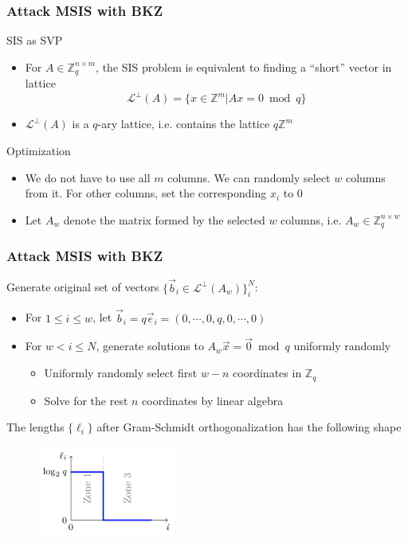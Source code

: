 \documentclass{beamer}
\newcommand{\bbZ}{\mathbb{Z}}
\newcommand{\vb}{\vec{b}}
\newcommand{\cLp}{\mathcal{L}^{\perp}}
\begin{document}
\frame
{
  \frametitle{Attack MSIS with BKZ}
  SIS as SVP
  \begin{itemize}
  	\item For $A\in\bbZ_q^{n\times m}$, the SIS problem is equivalent to finding a ``short'' vector in lattice
  		\[\cLp(A)=\{x\in\bbZ^m | Ax=0\bmod q\}\]
  	\item $\cLp(A)$ is a $q$-ary lattice, i.e. contains the lattice $q\mathbb{Z}^m$
  \end{itemize}

  Optimization
  \begin{itemize}
  	\item We do not have to use all $m$ columns. We can randomly select $w$ columns from it. For other columns, set the corresponding $x_i$ to $0$
  	\item Let $A_w$ denote the matrix formed by the selected $w$ columns, i.e. $A_w\in\bbZ_q^{n\times w}$
  \end{itemize}
}

\frame
{
  \frametitle{Attack MSIS with BKZ}
  Generate original set of vectors $\{\vb_i\in\cLp(A_w)\}_i^{N}$:
  \begin{itemize}
  	\item For $1\leq i\leq w$, let $\vb_i=q\vec{e}_i=(0,\cdots,0,q,0,\cdots,0)$
  	\item For $w<i\leq N$, generate solutions to $A_w\vec{x}=\vec{0}\bmod q$ uniformly randomly
  	\begin{itemize}
  		\item Uniformly randomly select first $w-n$ coordinates in $\bbZ_q$
  		\item Solve for the rest $n$ coordinates by linear algebra
  	\end{itemize}
  \end{itemize}

  The lengths $\{\ell_i\}$ after Gram-Schmidt orthogonalization has the following shape
  \begin{figure}[ht!]
  \includegraphics[width=0.4\textwidth]{files/before-reduction.png}
  \end{figure}
}
\end{document}
